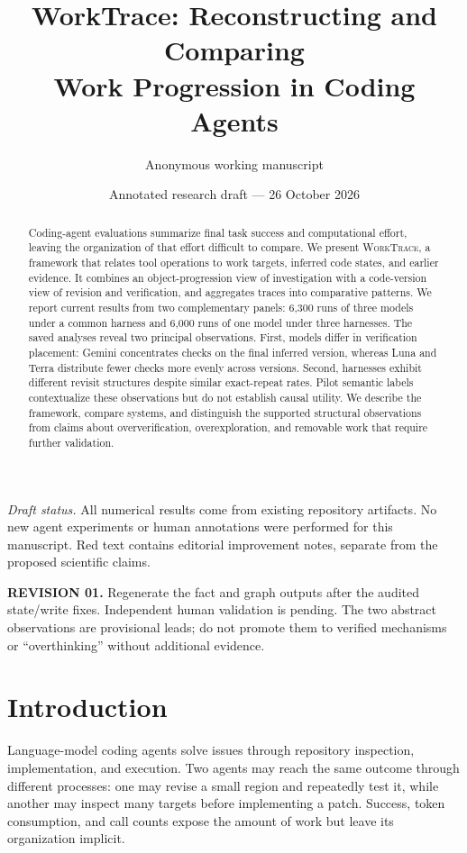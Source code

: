 \documentclass[10pt,a4paper,twocolumn]{article}
\title{\textbf{WorkTrace: Reconstructing and Comparing\\Work Progression in Coding Agents}}
\author{Anonymous working manuscript}
\date{Annotated research draft --- 26 October 2026}
\newcommand{\rev}[2]{\par\smallskip\noindent\begin{minipage}{\linewidth}\color{revision}\footnotesize\textbf{REVISION #1.} #2\end{minipage}\par\smallskip}
\newcommand{\wt}{\textsc{WorkTrace}}
\begin{document}
\maketitle
\begin{abstract}
Coding-agent evaluations summarize final task success and computational effort, leaving the organization of that effort difficult to compare. We present \wt, a framework that relates tool operations to work targets, inferred code states, and earlier evidence. It combines an object-progression view of investigation with a code-version view of revision and verification, and aggregates traces into comparative patterns. We report current results from two complementary panels: 6,300 runs of three models under a common harness and 6,000 runs of one model under three harnesses. The saved analyses reveal two principal observations. First, models differ in verification placement: Gemini concentrates checks on the final inferred version, whereas Luna and Terra distribute fewer checks more evenly across versions. Second, harnesses exhibit different revisit structures despite similar exact-repeat rates. Pilot semantic labels contextualize these observations but do not establish causal utility. We describe the framework, compare systems, and distinguish the supported structural observations from claims about oververification, overexploration, and removable work that require further validation.
\end{abstract}\par\medskip
\noindent\textit{Draft status.} All numerical results come from existing repository artifacts. No new agent experiments or human annotations were performed for this manuscript. Red text contains editorial improvement notes, separate from the proposed scientific claims.
\rev{01}{Regenerate the fact and graph outputs after the audited state/write fixes. Independent human validation is pending. The two abstract observations are provisional leads; do not promote them to verified mechanisms or ``overthinking'' without additional evidence.}

\section{Introduction}
Language-model coding agents solve issues through repository inspection, implementation, and execution. Two agents may reach the same outcome through different processes: one may revise a small region and repeatedly test it, while another may inspect many targets before implementing a patch. Success, token consumption, and call counts expose the amount of work but leave its organization implicit.
\end{document}
